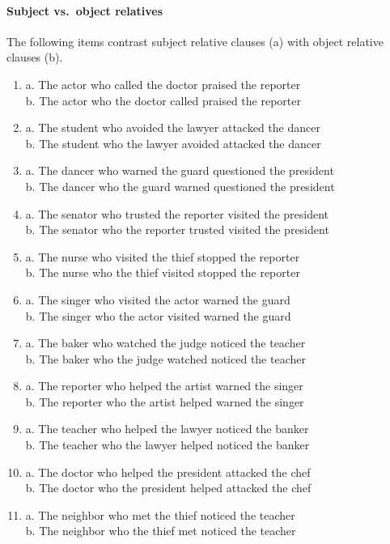 \documentclass[11pt]{article}
\begin{document}
\paragraph{Subject vs.\ object relatives}
The following items contrast subject relative clauses (a) with object relative clauses (b).
\begin{enumerate}[label={(\arabic*)}, nosep]
  \small
  \item a. The actor who called the doctor praised the reporter \\ b. The actor who the doctor called praised the reporter
  \item a. The student who avoided the lawyer attacked the dancer \\ b. The student who the lawyer avoided attacked the dancer
  \item a. The dancer who warned the guard questioned the president \\ b. The dancer who the guard warned questioned the president
  \item a. The senator who trusted the reporter visited the president \\ b. The senator who the reporter trusted visited the president
  \item a. The nurse who visited the thief stopped the reporter \\ b. The nurse who the thief visited stopped the reporter
  \item a. The singer who visited the actor warned the guard \\ b. The singer who the actor visited warned the guard
  \item a. The baker who watched the judge noticed the teacher \\ b. The baker who the judge watched noticed the teacher
  \item a. The reporter who helped the artist warned the singer \\ b. The reporter who the artist helped warned the singer
  \item a. The teacher who helped the lawyer noticed the banker \\ b. The teacher who the lawyer helped noticed the banker
  \item a. The doctor who helped the president attacked the chef \\ b. The doctor who the president helped attacked the chef
  \item a. The neighbor who met the thief noticed the teacher \\ b. The neighbor who the thief met noticed the teacher

\end{enumerate}
\end{document}

